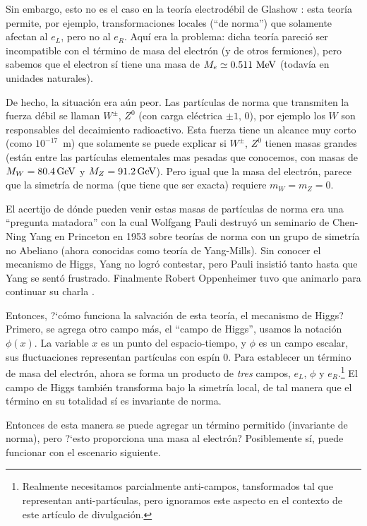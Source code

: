 Sin embargo, esto no es el caso en la teor\'ia electrod\'ebil de Glashow
\cite{Glashow}: esta teor\'ia permite, por ejemplo, transformaciones
locales (``de norma'') que solamente afectan al $e_L$, pero no al $e_R$.
Aqu\'i era la problema: dicha teor\'ia pareci\'o ser incompatible con
el t\'ermino de masa del electr\'on (y de otros fermiones), pero sabemos
que el electron s\'i tiene una masa de $M_e \simeq 0.511\ {\rm MeV}$
(todav\'ia en unidades naturales).

De hecho, la situaci\'on era a\'un peor. Las part\'iculas de norma
que transmiten la fuerza d\'ebil se llaman $W^{\pm}$, $Z^0$
(con carga el\'ectrica $\pm1, \, 0$), por ejemplo los $W$ son
responsables del decaimiento radioactivo. Esta fuerza tiene un
alcance muy corto (como $10^{-17}$~m) que solamente se puede
explicar si $W^{\pm}$, $Z^0$ tienen masas grandes (est\'an entre
las partículas elementales mas pesadas que conocemos, con
masas de $M_W = 80.4 \, {\rm GeV}$ y $M_Z = 91.2\,{\rm GeV}$). 
Pero igual que la masa del electr\'on, parece que la simetr\'ia
de norma (que tiene que ser exacta) requiere $m_W = m_Z = 0$.

El acertijo de d\'onde pueden venir estas masas de part\'iculas
de norma era una ``pregunta matadora'' con la cual Wolfgang Pauli
destruy\'o un seminario de Chen-Ning Yang en Princeton en 1953
sobre teor\'ias de
norma con un grupo de simetr\'ia no Abeliano (ahora conocidas como
teor\'ia de Yang-Mills). Sin conocer el mecanismo de Higgs, Yang no
logr\'o contestar, pero Pauli insisti\'o tanto hasta
que Yang se sent\'o frustrado. Finalmente Robert Oppenheimer tuvo
que animarlo para continuar su charla \cite{Shifman}.

Entonces, ?`c\'omo funciona la salvaci\'on de esta teor\'ia,
el mecanismo de Higgs? Primero, se agrega otro campo m\'as,
el ``campo de Higgs'', usamos la notaci\'on $\phi (x)$.
La variable $x$ es un punto del espacio-tiempo, y $\phi$ es
un campo escalar, sus fluctuaciones representan part\'iculas 
con esp\'in 0. Para establecer un t\'ermino de masa del electr\'on,
ahora se forma un producto de {\em tres} campos, $e_L$, $\phi$ y
$e_R$.\footnote{Realmente necesitamos parcialmente anti-campos,
tansformados tal que representan anti-part\'iculas, pero ignoramos
este aspecto en el contexto de este art\'iculo de divulgaci\'on.}
El campo de Higgs tambi\'en transforma bajo la simetr\'ia local,
de tal manera que el t\'ermino en su totalidad s\'i es invariante
de norma.

Entonces de esta manera se puede agregar un t\'ermino permitido
(invariante de norma), pero ?`esto proporciona una masa al electr\'on?
Posiblemente s\'i, puede funcionar con el escenario siguiente.

